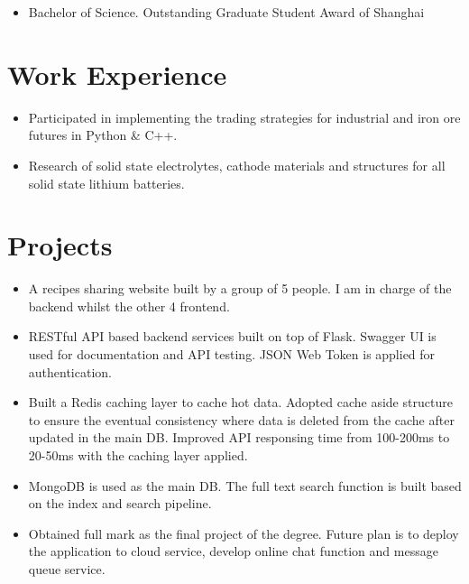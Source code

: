 \documentclass{resume}
\begin{document}
\begin{itemize}
\item Bachelor of Science. Outstanding Graduate Student Award of Shanghai 
\end{itemize}


\section{Work Experience}
\begin{itemize}
  \item Participated in implementing the trading strategies for industrial and iron ore futures in Python \& C++.
\end{itemize}

\begin{itemize}
  \item Research of solid state electrolytes, cathode materials and structures for all solid state lithium batteries.
\end{itemize}


\section{Projects}

\begin{itemize}
  \item A recipes sharing website built by a group of 5 people. I am in charge of the backend whilst the other 4 frontend.
  \item RESTful API based backend services built on top of Flask. Swagger UI is used for documentation and API testing. JSON Web Token is applied for authentication.
  \item Built a Redis caching layer to cache hot data. Adopted cache aside structure to ensure the eventual consistency where data is deleted from the cache after updated in the main DB. Improved API responsing time from 100-200ms to 20-50ms with the caching layer applied.
  \item MongoDB is used as the main DB. The full text search function is built based on the index and search pipeline.
  \item Obtained full mark as the final project of the degree. Future plan is to deploy the application to cloud service, develop online chat function and message queue service.
\end{itemize}
\end{document}
